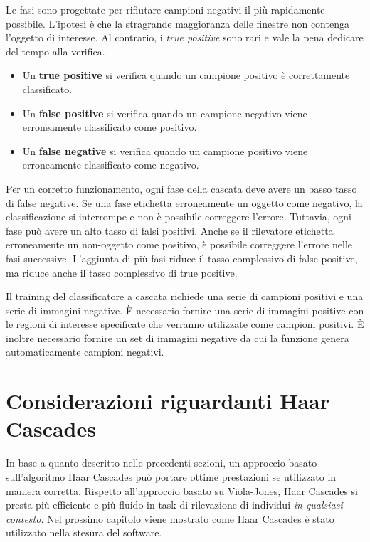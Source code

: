 Le fasi sono progettate per rifiutare campioni negativi il più rapidamente possibile. L'ipotesi è che la stragrande maggioranza delle finestre non contenga l'oggetto di interesse. Al contrario, i \emph{true positive} sono rari e vale la pena dedicare del tempo alla verifica.
\begin{itemize}
  \item Un \textbf{true positive} si verifica quando un campione positivo è correttamente classificato.
  \item Un \textbf{false positive} si verifica quando un campione negativo viene erroneamente classificato come positivo.
  \item Un \textbf{false negative} si verifica quando un campione positivo viene erroneamente classificato come negativo.
\end{itemize}

Per un corretto funzionamento, ogni fase della cascata deve avere un basso tasso di false negative. Se una fase etichetta erroneamente un oggetto come negativo, la classificazione si interrompe e non è possibile correggere l'errore. Tuttavia, ogni fase può avere un alto tasso di falsi positivi. Anche se il rilevatore etichetta erroneamente un non-oggetto come positivo, è possibile correggere l'errore nelle fasi successive. L'aggiunta di più fasi riduce il tasso complessivo di false positive, ma riduce anche il tasso complessivo di true positive.

Il training del classificatore a cascata richiede una serie di campioni positivi e una serie di immagini negative. È necessario fornire una serie di immagini positive con le regioni di interesse specificate che verranno utilizzate come campioni positivi. È inoltre necessario fornire un set di immagini negative da cui la funzione genera automaticamente campioni negativi.
\cite{haarcascades}\newpage


\section{Considerazioni riguardanti Haar Cascades}
\vspace{8mm}

In base a quanto descritto nelle precedenti sezioni, un approccio basato sull'algoritmo Haar Cascades può portare ottime prestazioni se utilizzato in maniera corretta.
Rispetto all'approccio basato su Viola-Jones, Haar Cascades si presta più efficiente e più fluido in task di rilevazione di individui \emph{in qualsiasi contesto}.
Nel prossimo capitolo viene mostrato come Haar Cascades è stato utilizzato nella stesura del software.
\newpage